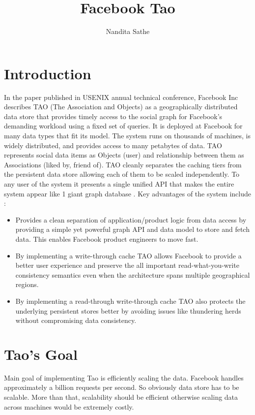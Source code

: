 \documentclass[9pt,twocolumn,twoside]{../../styles/osajnl}
\title{Facebook Tao}
\author[1,*]{Nandita Sathe}
\affil[1]{School of Informatics and Computing, Bloomington, IN 47408, U.S.A.}
\affil[*]{Corresponding author: nsathe@iu.edu}
\begin{document}
\maketitle

\section{Introduction}

In the paper published in USENIX annual technical conference, Facebook Inc describes TAO (The Association and Objects) as \cite{book-tao1} a geographically distributed data store that provides timely access to the social graph for Facebook’s demanding workload using a fixed set of queries. It is deployed at Facebook for many data types that fit its model. The system runs on thousands of machines, is widely distributed, and provides access to many petabytes of data. TAO represents social data items as Objects (user) and relationship between them as Associations (liked by, friend of). TAO cleanly separates the caching tiers from the persistent data store allowing each of them to be scaled independently. To any user of the system it presents a single unified API that makes the entire system appear like 1 giant graph database \cite{www-tao1}.
Key advantages of the system include \cite{www-tao1}:
\begin{itemize}
\item Provides a clean separation of application/product logic from data access by providing a simple yet powerful graph API and data model to store and fetch data. This enables Facebook product engineers to move fast.
\item By implementing a write-through cache TAO allows Facebook to provide a better user experience and preserve the all important read-what-you-write consistency semantics even when the architecture spans multiple geographical regions.
\item By implementing a read-through write-through cache TAO also protects the underlying persistent stores better by avoiding issues like thundering herds without compromising data consistency.

\end{itemize}

\section{Tao's Goal}
Main goal of implementing Tao is efficiently scaling the data. Facebook handles approximately a billion requests per second. So obviously data store has to be scalable. More than that, scalability should be efficient otherwise scaling data across machines would be extremely costly. 
\end{document}
